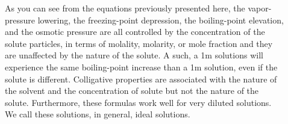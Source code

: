 \documentclass[main.tex]{subfiles}
\begin{document}
\begin{description}
\item[] 
As you can see from the equations previously presented here, the vapor-pressure lowering, the freezing-point depression, the boiling-point elevation, and the osmotic pressure are all controlled by the concentration of the solute particles, in terms of molality, molarity, or mole fraction and they are unaffected by the nature of the solute. A such, a 1m  solutions will experience the same boiling-point increase than a 1m  solution, even if the solute is different. Colligative properties are associated with the nature of the solvent and the concentration of solute but not the nature of the solute. Furthermore, these formulas work well for very diluted solutions. We call these solutions, in general, ideal solutions.




\end{description}
\end{document}
